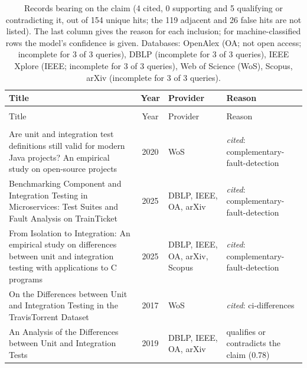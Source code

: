 
\begingroup\footnotesize
\begin{longtable}{@{}%
  >{\raggedright\arraybackslash}p{}c%
  >{\raggedright\arraybackslash}p{}%
  >{\raggedright\arraybackslash}p{}@{}}
\caption{Records bearing on the claim (4 cited, 0 supporting and 5 qualifying or contradicting it, out of 154 unique hits; the 119 adjacent and 26 false hits are not listed). The last column gives the reason for each inclusion; for machine-classified rows the model's confidence is given. Databases: OpenAlex (OA; not open access; incomplete for 3 of 3 queries), DBLP (incomplete for 3 of 3 queries), IEEE Xplore (IEEE; incomplete for 3 of 3 queries), Web of Science (WoS), Scopus, arXiv (incomplete for 3 of 3 queries).}\label{tab:t-sociable-solitary}\\
\toprule
Title & Year & Provider & Reason \\
\midrule
\endfirsthead
\multicolumn{4}{@{}l}{\emph{\tablename~\thetable{} (cont.)}}\\
\toprule
Title & Year & Provider & Reason \\
\midrule
\endhead
\midrule \multicolumn{4}{r@{}}{\emph{continued on next page}}\\
\endfoot
\bottomrule
\endlastfoot
Are unit and integration test definitions still valid for modern Java projects? An empirical study on open-source projects & 2020 & WoS & \emph{cited}: complementary-fault-detection \\
Benchmarking Component and Integration Testing in Microservices: Test Suites and Fault Analysis on TrainTicket & 2025 & DBLP, IEEE, OA, arXiv & \emph{cited}: complementary-fault-detection \\
From Isolation to Integration: An empirical study on differences between unit and integration testing with applications to C programs & 2025 & DBLP, IEEE, OA, arXiv, Scopus & \emph{cited}: complementary-fault-detection \\
On the Differences between Unit and Integration Testing in the TravisTorrent Dataset & 2017 & WoS & \emph{cited}: ci-differences \\
An Analysis of the Differences between Unit and Integration Tests & 2019 & DBLP, IEEE, OA, arXiv & qualifies or contradicts the claim (0.78) \\

\end{longtable}
